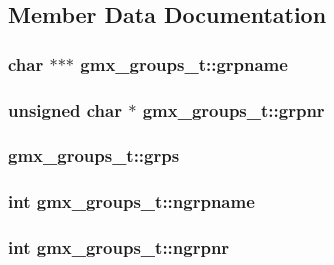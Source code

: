 \subsection{\-Member \-Data \-Documentation}
\hypertarget{structgmx__groups__t_af130d64f3e8e23056c5ccde76732c4dc}{
\subsubsection[{grpname}]{\setlength{\rightskip}{0pt plus 5cm}char $\ast$$\ast$$\ast$ {\bf gmx\-\_\-groups\-\_\-t\-::grpname}}}\label{structgmx__groups__t_af130d64f3e8e23056c5ccde76732c4dc}
\hypertarget{structgmx__groups__t_abc24e5ef51213680880b271656cb070b}{
\subsubsection[{grpnr}]{\setlength{\rightskip}{0pt plus 5cm}unsigned char $\ast$ {\bf gmx\-\_\-groups\-\_\-t\-::grpnr}}}\label{structgmx__groups__t_abc24e5ef51213680880b271656cb070b}
\hypertarget{structgmx__groups__t_a6b218acc5ad338f2a2b648d89a219233}{
\subsubsection[{grps}]{ {\bf gmx\-\_\-groups\-\_\-t\-::grps}}}\label{structgmx__groups__t_a6b218acc5ad338f2a2b648d89a219233}
\hypertarget{structgmx__groups__t_ae9c893662d5fc4c48ecfbc05a91d5934}{
\subsubsection[{ngrpname}]{\setlength{\rightskip}{0pt plus 5cm}int {\bf gmx\-\_\-groups\-\_\-t\-::ngrpname}}}\label{structgmx__groups__t_ae9c893662d5fc4c48ecfbc05a91d5934}
\hypertarget{structgmx__groups__t_a04cd846e32def495a65d55c33e0745a6}{
\subsubsection[{ngrpnr}]{\setlength{\rightskip}{0pt plus 5cm}int {\bf gmx\-\_\-groups\-\_\-t\-::ngrpnr}}}\label{structgmx__groups__t_a04cd846e32def495a65d55c33e0745a6}


